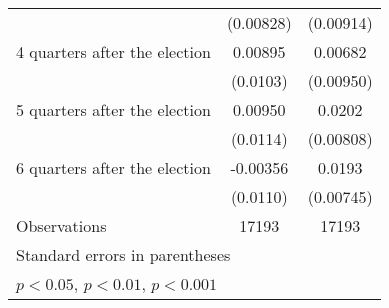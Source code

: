 \begin{table}[htbp]
\begin{tabular}{l*{2}{c}}
                    &   (0.00828)         &   (0.00914)         \\
[1em]
 4 quarters after the election&     0.00895         &     0.00682         \\
                    &    (0.0103)         &   (0.00950)         \\
[1em]
 5 quarters after the election&     0.00950         &      0.0202\sym{*}  \\
                    &    (0.0114)         &   (0.00808)         \\
[1em]
 6 quarters after the election&    -0.00356         &      0.0193\sym{**} \\
                    &    (0.0110)         &   (0.00745)         \\
\hline
Observations        &       17193         &       17193         \\
\hline\hline
\multicolumn{3}{l}{\footnotesize Standard errors in parentheses}\\
\multicolumn{3}{l}{\footnotesize \sym{*} \(p<0.05\), \sym{**} \(p<0.01\), \sym{***} \(p<0.001\)}\\
\end{tabular}
\end{table}
